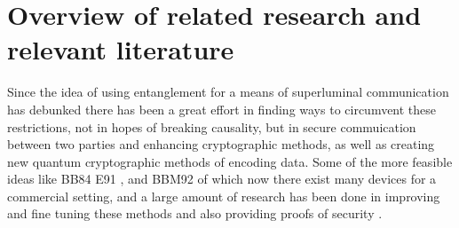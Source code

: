 \documentclass{article}
\theoremstyle{mytheoremstyle}
\theoremstyle{mytheoremstyle}
\theoremstyle{myproblemstyle}
\begin{document}
\section{Overview of related research and relevant literature}

Since the idea of using entanglement for a means of superluminal communication has debunked \cite{Dieks_1982} there has been a great effort
in finding ways to circumvent these restrictions, not in hopes of breaking causality, but in secure commuication between two parties and 
enhancing cryptographic methods, as well as creating new quantum cryptographic methods of encoding data.
Some of the more feasible ideas like BB84\cite{BB84} E91 \cite{E91}, and BBM92 \cite{Bennett_Brassard_Mermin_1992} of which now there exist many
devices for a commercial setting, and a large amount of research has been done in improving and fine tuning these methods and 
also providing proofs of security \cite{Rusca_Boaron_Curty_Martin_Zbinden_2018,Rusca_Boaron_Grünenfelder_Martin_Zbinden_2018}.
\end{document}
